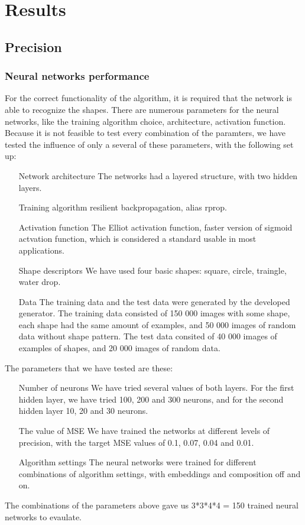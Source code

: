 \chapter{Results}

\section{Precision}

\subsection{Neural networks performance}
For the correct functionality of the algorithm, it is required that the network is able to recognize the shapes. There are numerous parameters for the neural networks, like the training algorithm choice, architecture, activation function. Because it is not feasible to test every combination of the paramters, we have tested the influence of only a several of these parameters, with the following set up:
\begin{enumerate}
\item [Network architecture] The networks had a layered structure, with two hidden layers.
\item [Training algorithm] resilient backpropagation, alias rprop.
\item [Activation function] The Elliot activation function, faster version of sigmoid actvation function, which is considered a standard usable in most applications.
\item [Shape descriptors] We have used four basic shapes: square, circle, traingle, water drop. 
\item [Data] The training data and the test data were generated by the developed generator. The training data consisted of 150 000 images with some shape, each shape had the same amount of examples, and 50 000 images of random data without shape pattern. The test data consited of 40 000 images of examples of shapes, and 20 000 images of random data.
\end{enumerate}

The parameters that we have tested are these:
\begin{enumerate}
\item [Number of neurons] We have tried several values of both layers. For the first hidden layer, we have tried 100, 200 and 300 neurons, and for the second hidden layer 10, 20 and 30 neurons. 
\item [The value of MSE] We have trained the networks at different levels of precision, with the target MSE values of 0.1, 0.07, 0.04 and 0.01.   
\item [Algorithm settings] The neural networks were trained for different combinations of algorithm settings, with embeddings and composition off and on.
\end{enumerate}
The combinations of the parameters above gave us 3*3*4*4 = 150 trained neural networks to evaulate.

